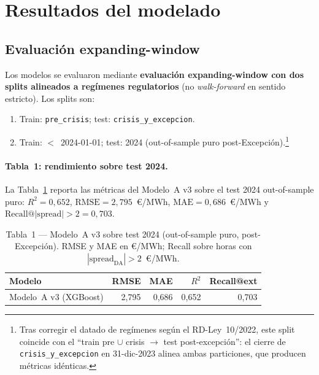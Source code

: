 \documentclass[11pt,a4paper]{article}
\begin{document}
\section{Resultados del modelado}

\subsection{Evaluación expanding-window}\label{sec:bench}

Los modelos se evaluaron mediante \textbf{evaluación expanding-window
con dos splits alineados a regímenes regulatorios} (no \emph{walk-forward}
en sentido estricto). Los splits son:

\begin{enumerate}
\item Train: \texttt{pre\_crisis}; test: \texttt{crisis\_y\_excepcion}.
\item Train: $<$~2024-01-01; test: 2024 (out-of-sample puro
post-Excepción).\footnote{Tras corregir el datado de regímenes según
el RD-Ley~10/2022, este split coincide con el ``train pre $\cup$ crisis
$\to$ test post-excepción'': el cierre de \texttt{crisis\_y\_excepcion}
en 31-dic-2023 alinea ambas particiones, que producen métricas
idénticas.}
\end{enumerate}

\paragraph{Tabla~1: rendimiento sobre test 2024.} La Tabla~\ref{tab:t1}
reporta las métricas del Modelo~A v3 sobre el test 2024 out-of-sample
puro: $R^2 = 0{,}652$, $\mathrm{RMSE} = 2{,}795$~€/MWh,
$\mathrm{MAE} = 0{,}686$~€/MWh y
$\mathrm{Recall@}|\!\mathrm{spread}|>2 = 0{,}703$.

\begin{table}[H]
\centering
\small
\caption{Tabla~1 — Modelo~A v3 sobre test 2024 (out-of-sample puro,
post-Excepción). RMSE y MAE en €/MWh; Recall sobre horas con
$|\mathrm{spread}_{\mathrm{DA}}| > 2$~€/MWh.}
\label{tab:t1}
\begin{tabular}{lrrrr}
\toprule
\textbf{Modelo} & \textbf{RMSE} & \textbf{MAE} & \textbf{$R^2$} & \textbf{Recall@ext} \\
\midrule
Modelo~A v3 (XGBoost) & 2{,}795 & 0{,}686 & 0{,}652 & 0{,}703 \\
\bottomrule
\end{tabular}
\end{table}
\end{document}
